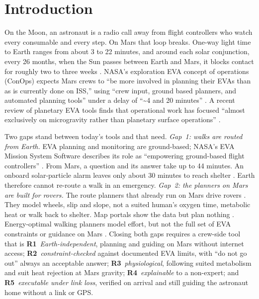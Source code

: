 \section{Introduction}
\label{sec:intro}

On the Moon, an astronaut is a radio call away from flight controllers who watch every consumable and every step. On Mars that loop breaks. One-way light time to Earth ranges from about 3 to 22 minutes, and around each solar conjunction, every 26 months, when the Sun passes between Earth and Mars, it blocks contact for roughly two to three weeks \citep{mcbrayer2022comms}. NASA's exploration EVA concept of operations (ConOps) expects Mars crews to ``be more involved in planning their EVAs than as is currently done on ISS,'' using ``crew input, ground based planners, and automated planning tools'' under a delay of ``\textasciitilde4 and 20 minutes'' \citep{coan2020conops}. A recent review of planetary EVA tools finds that operational work has focused ``almost exclusively on microgravity rather than planetary surface operations'' \citep{elston2026review}.

Two gaps stand between today's tools and that need.
\emph{Gap~1: walks are routed from Earth.} EVA planning and monitoring are ground-based; NASA's EVA Mission System Software describes its role as ``empowering ground-based flight controllers'' \citep{miller2026emss}. From Mars, a question and its answer take up to 44 minutes. An onboard solar-particle alarm leaves only about 30 minutes to reach shelter \citep{lowe2025nowcast}. Earth therefore cannot re-route a walk in an emergency.
\emph{Gap~2: the planners on Mars are built for rovers.} The route planners that already run on Mars drive rovers \citep{carsten2009,toupet2026enav}. They model wheels, slip and slope, not a suited human's oxygen time, metabolic heat or walk back to shelter. Map portals show the data but plan nothing \citep{marstrek,mmgis}. Energy-optimal walking planners model effort, but not the full set of EVA constraints or guidance on Mars \citep{johnson2010sextant,penaasensio2024moonpath}.
Closing both gaps requires a crew-side tool that is
\textbf{R1}~\emph{Earth-independent}, planning and guiding on Mars without internet access;
\textbf{R2}~\emph{constraint-checked} against documented EVA limits, with ``do not go out'' always an acceptable answer;
\textbf{R3}~\emph{physiological}, following suited metabolism and suit heat rejection at Mars gravity;
\textbf{R4}~\emph{explainable} to a non-expert; and
\textbf{R5}~\emph{executable under link loss}, verified on arrival and still guiding the astronaut home without a link or GPS.

